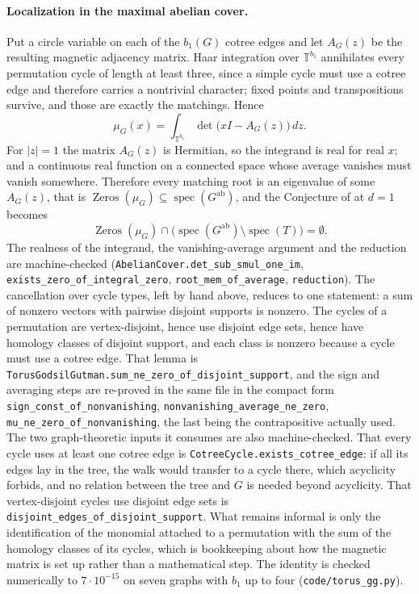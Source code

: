 \documentclass[11pt]{article}
\theoremstyle{remark}
\begin{document}
\paragraph{Localization in the maximal abelian cover.}
Put a circle variable on each of the $b_1(G)$ cotree edges and let $A_G(z)$ be the
resulting magnetic adjacency matrix. Haar integration over $\mathbb T^{b_1}$ annihilates
every permutation cycle of length at least three, since a simple cycle must use a cotree
edge and therefore carries a nontrivial character; fixed points and transpositions survive,
and those are exactly the matchings. Hence
\[
\mu_G(x)=\int_{\mathbb T^{b_1}}\det\bigl(xI-A_G(z)\bigr)\,dz .
\]
For $|z|=1$ the matrix $A_G(z)$ is Hermitian, so the integrand is real for real $x$; and a
continuous real function on a connected space whose average vanishes must vanish somewhere.
Therefore every matching root is an eigenvalue of some $A_G(z)$, that is
$\operatorname{Zeros}(\mu_G)\subseteq\operatorname{spec}(G^{\mathrm{ab}})$, and
the Conjecture of \cite{PartI} at $d=1$ becomes
\[
\operatorname{Zeros}(\mu_G)\cap\bigl(\operatorname{spec}(G^{\mathrm{ab}})\setminus
\operatorname{spec}(T)\bigr)=\emptyset .
\]
The realness of the integrand, the vanishing-average argument and the reduction are
machine-checked (\texttt{AbelianCover.det\_sub\_smul\_one\_im},
\texttt{exists\_zero\_of\_integral\_zero}, \texttt{root\_mem\_of\_average},
\texttt{reduction}). The cancellation over cycle types, left by hand above, reduces to one
statement: a sum of nonzero vectors with pairwise disjoint supports is nonzero. The cycles of
a permutation are vertex-disjoint, hence use disjoint edge sets, hence have homology classes
of disjoint support, and each class is nonzero because a cycle must use a cotree edge. That
lemma is \texttt{TorusGodsilGutman.sum\_ne\_zero\_of\_disjoint\_support}, and the sign and
averaging steps are re-proved in the same file in the compact form
\texttt{sign\_const\_of\_nonvanishing}, \texttt{nonvanishing\_average\_ne\_zero},
\texttt{mu\_ne\_zero\_of\_nonvanishing}, the last being the contrapositive actually used.
The two graph-theoretic inputs it consumes are also machine-checked. That every cycle uses at
least one cotree edge is \texttt{CotreeCycle.exists\_cotree\_edge}: if all its edges lay in
the tree, the walk would transfer to a cycle there, which acyclicity forbids, and no relation
between the tree and $G$ is needed beyond acyclicity. That vertex-disjoint cycles use disjoint
edge sets is \texttt{disjoint\_edges\_of\_disjoint\_support}. What remains informal is only
the identification of the monomial attached to a permutation with the sum of the homology
classes of its cycles, which is bookkeeping about how the magnetic matrix is set up rather
than a mathematical step. The
identity is checked numerically to $7\cdot10^{-15}$ on seven graphs with $b_1$ up to four
(\texttt{code/torus\_gg.py}).
\end{document}
